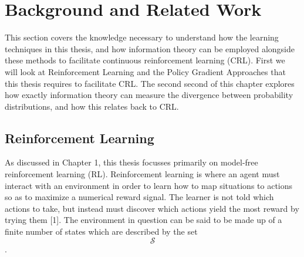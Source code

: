 \chapter{Background and Related Work}

This section covers the knowledge necessary to understand how the learning techniques in this thesis, and how information theory can be employed alongside these methods to facilitate continuous reinforcement learning (CRL). First we will look at Reinforcement Learning and the Policy Gradient Approaches that this thesis requires to facilitate CRL. The second second of this chapter explores how exactly information theory can measure the divergence between probability distributions, and how this relates back to CRL.

\section{Reinforcement Learning}
As discussed in Chapter 1, this thesis focusses primarily on model-free reinforcement learning (RL). Reinforcement learning is where an agent must interact with an environment in order to learn how to map situations to actions so as to maximize a numerical reward signal. The learner is not told which actions to take, but instead must discover which actions yield the most reward by trying them [1]. The environment in question can be said to be made up of a finite number of states which are described by the set $$\mathcal{S}$$. 
